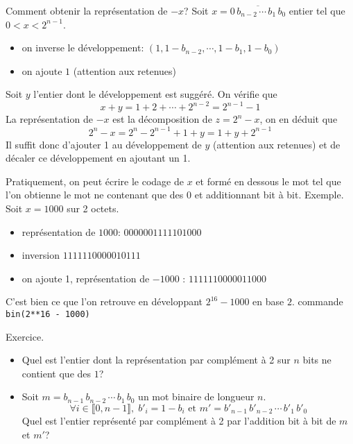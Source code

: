 Comment obtenir la représentation de $-x$?\newline
Soit $x = \overline{0\,b_{n-2}\,\cdots\, b_1\, b_0}$ entier tel que $0<x<2^{n-1}$.  
\begin{itemize}
  \item on inverse le développement: $(1,1-b_{n-2},\cdots,1-b_1,1-b_0)$
  \item on ajoute $1$ (attention aux retenues)
\end{itemize}
\begin{demo}
 Soit $y$ l'entier dont le développement est suggéré. On vérifie que
\begin{displaymath}
 x+y = 1+2+\cdots+2^{n-2} = 2^{n-1}-1
\end{displaymath}
La représentation de $-x$ est la décomposition de $z = 2^{n}-x$, on en déduit que
\begin{displaymath}
 2^{n}-x = 2^{n} - 2^{n-1} + 1 +y=1+y+2^{n-1}
\end{displaymath}
Il suffit donc d'ajouter 1 au développement de $y$ (attention aux retenues) et de décaler ce développement en ajoutant un 1.\newline  
\end{demo}
Pratiquement, on peut écrire le codage de $x$ et formé en dessous le mot tel que l'on obtienne le mot ne contenant que des $0$ et additionnant bit à bit.
Exemple. Soit $x=1000$ sur 2 octets.
\begin{itemize}
  \item représentation de $1000$: $0000001111101000$
  \item inversion $1111110000010111$
  \item on ajoute 1, représentation de $-1000$ : $1111110000011000$ 
\end{itemize}
C'est bien ce que l'on retrouve en développant $2^{16}-1000$ en base $2$.\newline
commande \texttt{bin(2**16 - 1000)}

Exercice.
\begin{itemize}
  \item Quel est l'entier dont la représentation par complément à 2 sur $n$ bits ne contient que des $1$?
  \item Soit $m = b_{n-1}\,b_{n-2}\,\cdots\,b_1\,b_0$ un mot binaire de longueur $n$.
\begin{displaymath}
  \forall i\in \llbracket 0,n-1\rrbracket, \; b'_i = 1-b_i \text{ et } m' = b'_{n-1}\,b'_{n-2}\,\cdots\,b'_1\,b'_0
\end{displaymath}
  Quel est l'entier représenté par complément à 2 par l'addition bit à bit de $m$ et $m'$? 
\end{itemize}

